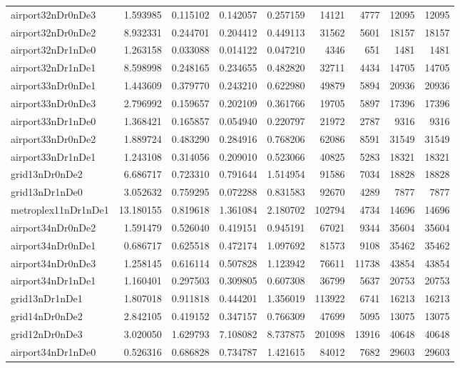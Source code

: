 \begin{longtable}{|l|r|r|r|r|r|r|r|r|}
airport32nDr0nDe3 & 1.593985 & 0.115102 & 0.142057 & 0.257159 & 14121 & 4777 & 12095 & 12095 \\
airport32nDr0nDe2 & 8.932331 & 0.244701 & 0.204412 & 0.449113 & 31562 & 5601 & 18157 & 18157 \\
airport32nDr1nDe0 & 1.263158 & 0.033088 & 0.014122 & 0.047210 & 4346 & 651 & 1481 & 1481 \\
airport32nDr1nDe1 & 8.598998 & 0.248165 & 0.234655 & 0.482820 & 32711 & 4434 & 14705 & 14705 \\
airport33nDr0nDe1 & 1.443609 & 0.379770 & 0.243210 & 0.622980 & 49879 & 5894 & 20936 & 20936 \\
airport33nDr0nDe3 & 2.796992 & 0.159657 & 0.202109 & 0.361766 & 19705 & 5897 & 17396 & 17396 \\
airport33nDr1nDe0 & 1.368421 & 0.165857 & 0.054940 & 0.220797 & 21972 & 2787 & 9316 & 9316 \\
airport33nDr0nDe2 & 1.889724 & 0.483290 & 0.284916 & 0.768206 & 62086 & 8591 & 31549 & 31549 \\
airport33nDr1nDe1 & 1.243108 & 0.314056 & 0.209010 & 0.523066 & 40825 & 5283 & 18321 & 18321 \\
grid13nDr0nDe2 & 6.686717 & 0.723310 & 0.791644 & 1.514954 & 91586 & 7034 & 18828 & 18828 \\
grid13nDr1nDe0 & 3.052632 & 0.759295 & 0.072288 & 0.831583 & 92670 & 4289 & 7877 & 7877 \\
metroplex11nDr1nDe1 & 13.180155 & 0.819618 & 1.361084 & 2.180702 & 102794 & 4734 & 14696 & 14696 \\
airport34nDr0nDe2 & 1.591479 & 0.526040 & 0.419151 & 0.945191 & 67021 & 9344 & 35604 & 35604 \\
airport34nDr0nDe1 & 0.686717 & 0.625518 & 0.472174 & 1.097692 & 81573 & 9108 & 35462 & 35462 \\
airport34nDr0nDe3 & 1.258145 & 0.616114 & 0.507828 & 1.123942 & 76611 & 11738 & 43854 & 43854 \\
airport34nDr1nDe1 & 1.160401 & 0.297503 & 0.309805 & 0.607308 & 36799 & 5637 & 20753 & 20753 \\
grid13nDr1nDe1 & 1.807018 & 0.911818 & 0.444201 & 1.356019 & 113922 & 6741 & 16213 & 16213 \\
grid14nDr0nDe2 & 2.842105 & 0.419152 & 0.347157 & 0.766309 & 47699 & 5095 & 13075 & 13075 \\
grid12nDr0nDe3 & 3.020050 & 1.629793 & 7.108082 & 8.737875 & 201098 & 13916 & 40648 & 40648 \\
airport34nDr1nDe0 & 0.526316 & 0.686828 & 0.734787 & 1.421615 & 84012 & 7682 & 29603 & 29603 \\

\end{longtable}
